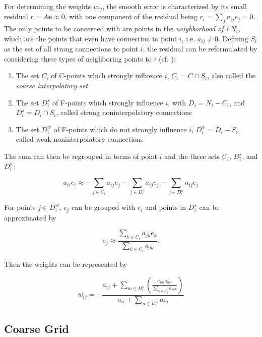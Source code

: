 For determining the weights $w_{ij}$, the smooth error is characterized by its small residual $r = A\mathbf{e} \approx 0$, with one component of the residual being $r_i = \sum_{j}{a_{ij}e_j} = 0$. The only points to be concerned with are points in the \emph{neighborhood of i} $N_i$, which are the points that even have connection to point $i$, i.e. $a_{ij} \neq 0$. Defining $S_i$ as the set of all strong connections to point $i$, the residual can be reformulated by considering three types of neighboring points to $i$ (cf. \cite{Briggs2000}):
\begin{enumerate}
	\item The set $C_i$ of C-points which strongly influence $i$, $C_i = C \cap S_i$, also called the \emph{coarse interpolatory set}
	\item The set $D_i^s$ of F-points which strongly influence $i$, with $D_i = N_i - C_i$, and $D_i^s = D_i \cap S_i$, called strong noninterpolatory connections
	\item The set $D_i^w$ of F-points which do not strongly influence $i$, $D_i^w = D_i - S_i$, called weak noninterpolatory connections
\end{enumerate}

The sum can then be regrouped in terms of point $i$ and the three sets $C_i$, $D_i^s$, and $D_i^w$:

\begin{equation}
	a_{ii}e_i \approx -\sum_{j \in C_i}{a_{ij}e_j} - \sum_{j \in D_i^s}{a_{ij}e_j} - \sum_{j \in D_i^w}{a_{ij}e_j}
\end{equation}

For points $j \in D_i^w$, $e_j$ can be grouped with $e_i$ and points in $D_i^s$ can be approximated by

\begin{equation}
	e_j \approx \frac{\displaystyle \sum_{k \in C_i}{a_{jk}e_k}}{\displaystyle \sum_{k \in C_i}{a_{jk}}}.
	\label{ej_approx}
\end{equation}

Then the weights can be represented by

\begin{equation}
	w_{ij} = - \frac{a_{ij} + \displaystyle \sum_{m \in D_i^s}{\left(\frac{a_{im}a_{mj}}{\displaystyle \sum_{k \in C_i}{a_{mk}}}\right)}}{a_{ii} + \displaystyle \sum_{n \in D_i^w}{a_{in}}}
\end{equation}

\subsection{Coarse Grid}

